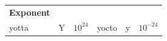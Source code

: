 {{\begin{center}
\begin{tabular}[t]{|l|l|l|l|l|l|}
    
        
                \textbf{Exponent}
     \tabularnewline\cline{1-1}\cline{2-2}\cline{3-3}\cline{4-4}\cline{5-5}\cline{6-6}
    
    
        yotta &
    
    
        Y &
    
    
        
                \begin{math}{10}^{24}\end{math}
               &
    
    
        yocto &
    
    
        y &
    
    
        
                \begin{math}{10}^{-24}\end{math}
     \tabularnewline\cline{1-1}\cline{2-2}\cline{3-3}\cline{4-4}\cline{5-5}\cline{6-6}
    

\end{tabular}
\end{center}}}
